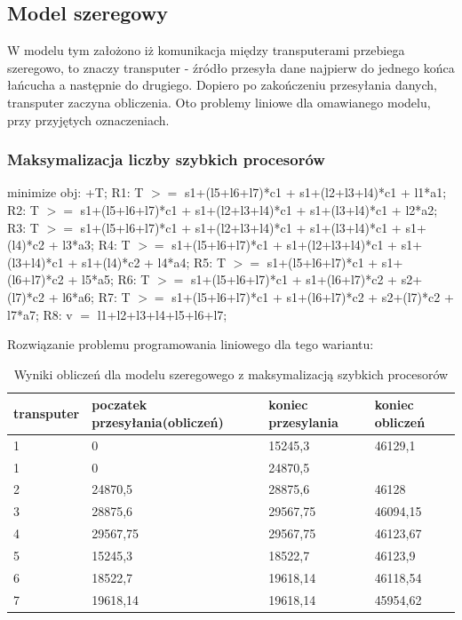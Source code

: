 \documentclass[a4paper,11pt, titlepage]{article}
\begin{document}
\subsection{Model szeregowy}
W modelu tym założono iż komunikacja między transputerami przebiega szeregowo,  to znaczy transputer - źródło przesyła dane najpierw do jednego końca łańcucha a następnie do drugiego. Dopiero po zakończeniu przesyłania danych, transputer zaczyna obliczenia. Oto problemy liniowe dla omawianego modelu, przy przyjętych oznaczeniach.

\subsubsection{Maksymalizacja liczby szybkich procesorów}
\begin{flushleft}

minimize obj: +T;\linebreak
\linebreak
R1: T $>=$ s1+(l5+l6+l7)*c1 + s1+(l2+l3+l4)*c1 + l1*a1;\linebreak
R2: T $>=$ s1+(l5+l6+l7)*c1 + s1+(l2+l3+l4)*c1 + s1+(l3+l4)*c1 + l2*a2;\linebreak
R3: T $>=$ s1+(l5+l6+l7)*c1 + s1+(l2+l3+l4)*c1 + s1+(l3+l4)*c1 + s1+(l4)*c2 + l3*a3;\linebreak
R4: T $>=$ s1+(l5+l6+l7)*c1 + s1+(l2+l3+l4)*c1 + s1+(l3+l4)*c1 + s1+(l4)*c2 + l4*a4;\linebreak
R5: T $>=$ s1+(l5+l6+l7)*c1 + s1+(l6+l7)*c2 + l5*a5;\linebreak
R6: T $>=$ s1+(l5+l6+l7)*c1 + s1+(l6+l7)*c2 + s2+(l7)*c2 + l6*a6;\linebreak
R7: T $>=$ s1+(l5+l6+l7)*c1 + s1+(l6+l7)*c2 + s2+(l7)*c2 + l7*a7;\linebreak
R8: v $=$ l1+l2+l3+l4+l5+l6+l7;\linebreak
\end{flushleft}

Rozwiązanie problemu programowania liniowego dla tego wariantu:
\begin{table}[h!]
\begin{tabular}{|l|l|l|l|}\hline
transputer & poczatek przesyłania(obliczeń) & koniec przesylania & koniec obliczeń\\ \hline
1	&0			&15245,3	&46129,1\\	\hline
1	&0			&24870,5	&\\	\hline
2	&24870,5	&28875,6	&46128\\	\hline
3	&28875,6 	&29567,75	&46094,15\\	\hline
4	&29567,75	&29567,75	&46123,67\\	\hline
5	&15245,3	&18522,7	&46123,9\\	\hline
6	&18522,7	&19618,14	&46118,54\\	\hline
7	&19618,14	&19618,14	&45954,62\\	\hline
\end{tabular}
\caption{Wyniki obliczeń dla modelu szeregowego z maksymalizacją szybkich procesorów \label{szeregowe_pt}}
\end{table}
\end{document}
